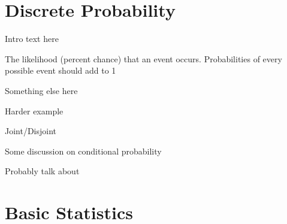 \documentclass[main.tex]{subfiles}
\begin{document}
\begin{thm}
	
\end{thm}

\begin{thm}
	
\end{thm}

\section{Discrete Probability}

Intro text here

\begin{defn}
	The likelihood (percent chance) that an event occurs. Probabilities of every possible event should add to 1
\end{defn}

\begin{example}
	
\end{example}

Something else here

\begin{example}
	Harder example
\end{example}

Joint/Disjoint

\begin{defn}
	
\end{defn}

\begin{defn}
	
\end{defn}

Some discussion on conditional probability

\begin{defn}
	
\end{defn}

\begin{defn}
	
\end{defn}

Probably talk about 

\section{Basic Statistics}
\end{document}
